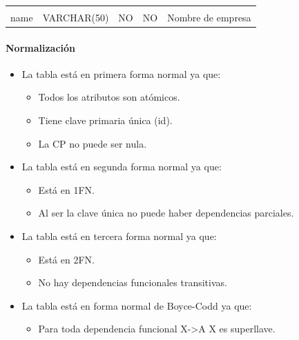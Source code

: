 \documentclass[12pt,a4paperpaper,]{report}
\providecommand{\tightlist}{%
  \setlength{\itemsep}{0pt}\setlength{\parskip}{0pt}}
\let\oldparagraph\paragraph
\renewcommand{\paragraph}[1]{\oldparagraph{#1}\mbox{}}
\begin{document}
\begin{longtable}[]{@{}lllll@{}}
\begin{minipage}[t]{0.11\columnwidth}
\end{minipage}\tabularnewline
\begin{minipage}[t]{0.21\columnwidth}\raggedright\strut
name\strut
\end{minipage} & \begin{minipage}[t]{0.19\columnwidth}\raggedright\strut
VARCHAR(50)\strut
\end{minipage} & \begin{minipage}[t]{0.16\columnwidth}\raggedright\strut
NO\strut
\end{minipage} & \begin{minipage}[t]{0.19\columnwidth}\raggedright\strut
NO\strut
\end{minipage} & \begin{minipage}[t]{0.11\columnwidth}\raggedright\strut
Nombre de empresa\strut
\end{minipage}\tabularnewline
\bottomrule
\end{longtable}

\paragraph{Normalización}\label{normalizaciuxf3n-2}

\begin{itemize}
\tightlist
\item
  La tabla está en primera forma normal ya que:

  \begin{itemize}
  \tightlist
  \item
    Todos los atributos son atómicos.
  \item
    Tiene clave primaria única (id).
  \item
    La CP no puede ser nula.
  \end{itemize}
\item
  La tabla está en segunda forma normal ya que:

  \begin{itemize}
  \tightlist
  \item
    Está en 1FN.
  \item
    Al ser la clave única no puede haber dependencias parciales.
  \end{itemize}
\item
  La tabla está en tercera forma normal ya que:

  \begin{itemize}
  \tightlist
  \item
    Está en 2FN.
  \item
    No hay dependencias funcionales transitivas.
  \end{itemize}
\item
  La tabla está en forma normal de Boyce-Codd ya que:

  \begin{itemize}
  \tightlist
  \item
    Para toda dependencia funcional X-\textgreater{}A X es superllave.
  \end{itemize}
\end{itemize}
\end{document}

